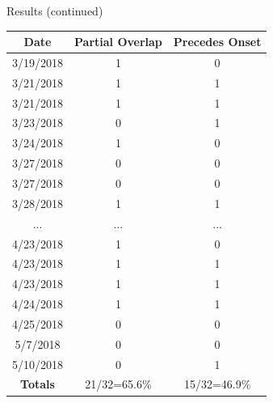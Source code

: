 \documentclass[final]{beamer}
\newlength{\onecolwid}
\begin{document}
\begin{frame}[t]
\begin{columns}[t]
\begin{column}{\onecolwid}
\begin{alertblock}{Results (continued)}
	\begin{center}
		\begin{tabular}{|c||c||c|} 
			\hline\hline
			Date & Partial Overlap & Precedes Onset\\
			\hline\hline
			3/19/2018 & 1 & 0\\
			\hline\hline
			3/21/2018 & 1 & 1\\
			\hline\hline
			3/21/2018 & 1 & 1\\
			\hline\hline
			3/23/2018 & 0 & 1\\
			\hline\hline
			3/24/2018 & 1 & 0\\
			\hline\hline
			3/27/2018 & 0 & 0\\
			\hline\hline
			3/27/2018 & 0 & 0\\
			\hline\hline
			3/28/2018 & 1 & 1\\
			\hline\hline
			\hline\hline
			... & ... & ...\\
			\hline\hline
			4/23/2018 & 1 & 0\\
			\hline\hline
			4/23/2018 & 1 & 1\\
			\hline\hline
			4/23/2018 & 1 & 1\\
			\hline\hline
			4/24/2018 & 1 & 1\\
			\hline\hline
			4/25/2018 & 0 & 0\\
			\hline\hline
			5/7/2018 & 0 & 0\\
			\hline\hline
			5/10/2018 & 0 & 1\\
			\hline\hline
			\textbf{Totals} & 21/32=65.6\% & 15/32=46.9\%\\
			\hline\hline
		\end{tabular}
	\end{center}


\end{alertblock}
\end{column}
\end{columns}
\end{frame}
\end{document}
